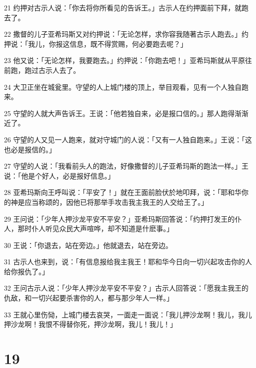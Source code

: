 \par 21 约押对古示人说：「你去将你所看见的告诉王。」古示人在约押面前下拜，就跑去了。
\par 22 撒督的儿子亚希玛斯又对约押说：「无论怎样，求你容我随著古示人跑去。」约押说：「我儿，你报这信息，既不得赏赐，何必要跑去呢？」
\par 23 他又说：「无论怎样，我要跑去。」约押说：「你跑去吧！」亚希玛斯就从平原往前跑，跑过古示人去了。
\par 24 大卫正坐在城瓮里。守望的人上城门楼的顶上，举目观看，见有一个人独自跑来。
\par 25 守望的人就大声告诉王。王说：「他若独自来，必是报口信的。」那人跑得渐渐近了。
\par 26 守望的人又见一人跑来，就对守城门的人说：「又有一人独自跑来。」王说：「这也必是报信的。」
\par 27 守望的人说：「我看前头人的跑法，好像撒督的儿子亚希玛斯的跑法一样。」王说：「他是个好人，必是报好信息。」
\par 28 亚希玛斯向王呼叫说：「平安了！」就在王面前脸伏於地叩拜，说：「耶和华你的神是应当称颂的，因他已将那举手攻击我主我王的人交给王了。」
\par 29 王问说：「少年人押沙龙平安不平安？」亚希玛斯回答说：「约押打发王的仆人，那时仆人听见众民大声喧哗，却不知道是什麽事。」
\par 30 王说：「你退去，站在旁边。」他就退去，站在旁边。
\par 31 古示人也来到，说：「有信息报给我主我王！耶和华今日向一切兴起攻击你的人给你报仇了。」
\par 32 王问古示人说：「少年人押沙龙平安不平安？」古示人回答说：「愿我主我王的仇敌，和一切兴起要杀害你的人，都与那少年人一样。」
\par 33 王就心里伤恸，上城门楼去哀哭，一面走一面说：「我儿押沙龙啊！我儿，我儿押沙龙啊！我恨不得替你死，押沙龙啊，我儿！我儿！」

\chapter{19}

